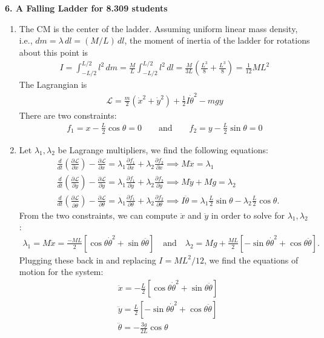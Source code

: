 \documentclass{article}
\theoremstyle{definition}
\newcommand{\p}{\partial}
\newcommand{\lag}{\mathcal{L}}
\newcommand{\f}[2]{\frac{#1}{#2}}
\newcommand{\lp}{\left(}
\newcommand{\rp}{\right)}
\newcommand{\lb}{\left[}
\newcommand{\rb}{\right]}
\begin{document}
\noindent \textbf{6. A Falling Ladder for 8.309 students} 
	\begin{enumerate}[label = (\alph*)]
		\item The CM is the center of the ladder. Assuming uniform linear mass density, i.e., $dm = \lambda \, dl = (M/L)\,dl$, the moment of inertia of the ladder for rotations about this point is
		\begin{align*}
		I = \int_{-L/2}^{L/2} l^2 \,dm = \f{M}{L} \int_{-L/2}^{L/2} l^2\,dl = \f{M}{3L} \lp \f{L^3}{8} + \f{L^3}{8} \rp = \boxed{\f{1}{12}ML^2} 
		\end{align*}
		The Lagrangian is 
		\begin{align*}
		\boxed{\lag = \f{m}{2}(\dot x^2 + \dot y^2) + \f{1}{2} I \dot\theta^2 - mgy}
		\end{align*}
		There are two constraints: 
		\begin{align*}
		\boxed{f_1 = x - \f{L}{2}\cos\theta = 0 \quad\quad \text{and} \quad\quad f_2 = y - \f{L}{2}\sin\theta = 0}
		\end{align*}
		
		\item Let $\lambda_1,\lambda_2$ be Lagrange multipliers, we find the following equations:
		\begin{align*}
		&\f{d}{dt}\lp \f{\p \lag}{\p \dot x} \rp - \f{\p \lag}{\p x} = \lambda_1  \f{\p f_1}{\p x} + \lambda_2 \f{\p f_2}{\p x} \implies M\ddot{x} = \lambda_1\\
		&\f{d}{dt}\lp \f{\p \lag}{\p \dot y} \rp - \f{\p \lag}{\p y} = \lambda_1  \f{\p f_1}{\p y} + \lambda_2 \f{\p f_2}{\p y} \implies M\ddot{y} + Mg = \lambda_2\\
		&\f{d}{dt}\lp \f{\p \lag}{\p \dot \theta} \rp - \f{\p \lag}{\p \theta} = \lambda_1  \f{\p f_1}{\p \theta} + \lambda_2 \f{\p f_2}{\p \theta} \implies I\ddot\theta = \lambda_1 \f{L}{2}\sin\theta-\lambda_2 \f{L}{2}\cos\theta.
		\end{align*}
		From the two constraints, we can compute $\ddot x$ and $\ddot y$ in order to solve for $\lambda_1,\lambda_2$:
		\begin{align*}
		\lambda_1 = M\ddot x = \f{-ML}{2}\lb \cos\theta \dot\theta^2 +\sin\theta \ddot\theta \rb \quad \text{and} \quad \lambda_2 = Mg + \f{ML}{2}\lb -\sin\theta \dot\theta^2 + \cos\theta \ddot\theta \rb .
		\end{align*}
		Plugging these back in and replacing $I=ML^2/12$, we find the equations of motion for the system:
		\begin{align*}
		&\boxed{\ddot{x} = -\f{L}{2}\lb \cos\theta \dot\theta^2 +\sin\theta \ddot\theta \rb}\\
		&\boxed{\ddot{y} = \f{L}{2}\lb -\sin\theta \dot\theta^2 + \cos\theta \ddot\theta \rb }\\
		&\boxed{\ddot\theta  = -\f{3g}{2L}\cos\theta}
		\end{align*}
		

\end{enumerate}
\end{document}
